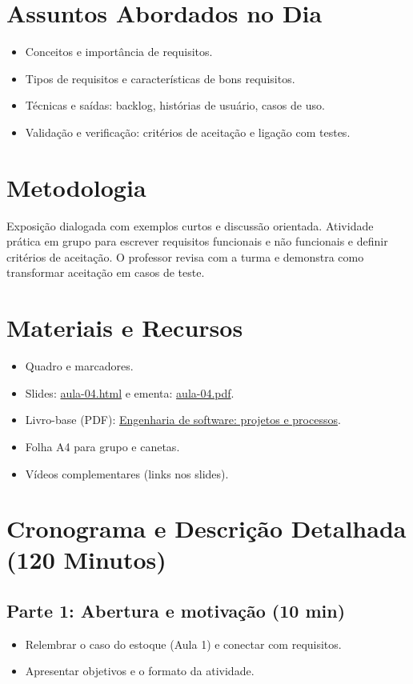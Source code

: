 \documentclass[12pt,a4paper]{article}
\begin{document}
\section{Assuntos Abordados no Dia}
\begin{itemize}[leftmargin=*,itemsep=0.25em]
  \item Conceitos e importância de requisitos.
  \item Tipos de requisitos e características de bons requisitos.
  \item Técnicas e saídas: backlog, histórias de usuário, casos de uso.
  \item Validação e verificação: critérios de aceitação e ligação com testes.
\end{itemize}

\section{Metodologia}
Exposição dialogada com exemplos curtos e discussão orientada. Atividade prática em grupo para escrever requisitos funcionais e não funcionais e definir critérios de aceitação. O professor revisa com a turma e demonstra como transformar aceitação em casos de teste.

\section{Materiais e Recursos}
\begin{itemize}[leftmargin=*,itemsep=0.25em]
  \item Quadro e marcadores.
  \item Slides: \href{aula-04.html}{aula-04.html} e ementa: \href{aula-04.pdf}{aula-04.pdf}.
  \item Livro-base (PDF): \href{../99-Materiais/Engenharia%20de%20software%20projetos%20e%20processos%20by%20Wilson%20de%20P%C3%A1dua%20Paula%20Filho%20.epub.pdf}{Engenharia de software: projetos e processos}.
  \item Folha A4 para grupo e canetas.
  \item Vídeos complementares (links nos slides).
\end{itemize}

\section{Cronograma e Descrição Detalhada (120 Minutos)}
\subsection*{Parte 1: Abertura e motivação (10 min)}
\begin{itemize}[leftmargin=*,itemsep=0.35em]
  \item Relembrar o caso do estoque (Aula 1) e conectar com requisitos.
  \item Apresentar objetivos e o formato da atividade.
\end{itemize}
\end{document}
